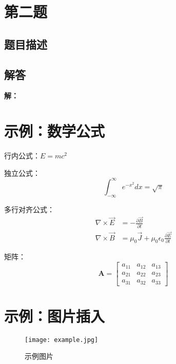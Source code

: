 \documentclass[12pt,a4paper]{article}
\numberwithin{equation}{section}
\newcommand{\mat}[1]{\boldsymbol{#1}}
\newcommand{\answerbox}[1]{\fbox{\parbox{\textwidth}{#1}}}
\newcommand{\solution}{\textbf{解：}}
\begin{document}
\answerbox{
}

\section{第二题}

\subsection{题目描述}

\subsection{解答}

\solution

\answerbox{
}


\section{示例：数学公式}

行内公式：$E = mc^2$

独立公式：
\begin{equation}
\int_{-\infty}^{\infty} e^{-x^2} dx = \sqrt{\pi}
\label{eq:gaussian}
\end{equation}

多行对齐公式：
\begin{align}
\nabla \times \vec{E} &= -\frac{\partial \vec{B}}{\partial t} \\
\nabla \times \vec{B} &= \mu_0 \vec{J} + \mu_0 \epsilon_0 \frac{\partial \vec{E}}{\partial t}
\end{align}

矩阵：
\begin{equation}
\mat{A} = \begin{bmatrix}
a_{11} & a_{12} & a_{13} \\
a_{21} & a_{22} & a_{23} \\
a_{31} & a_{32} & a_{33}
\end{bmatrix}
\end{equation}

\section{示例：图片插入}

\begin{figure}[H]
    \centering
    \texttt{[image: example.jpg]}
    \caption{示例图片}
    \label{fig:example}
\end{figure}
\end{document}
